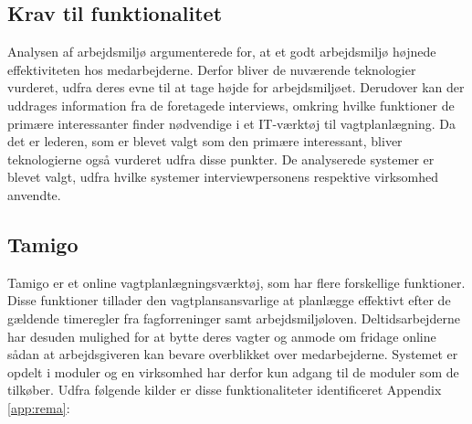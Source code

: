 \subsection{Krav til funktionalitet}
Analysen af arbejdsmiljø argumenterede for, at et godt arbejdsmiljø højnede effektiviteten hos medarbejderne. Derfor bliver de nuværende teknologier vurderet, udfra deres evne til at tage højde for arbejdsmiljøet. Derudover kan der uddrages information fra de foretagede interviews, omkring hvilke funktioner de primære interessanter finder nødvendige i et IT-værktøj til vagtplanlægning. Da det er lederen, som er blevet valgt som den primære interessant, bliver teknologierne også vurderet udfra disse punkter. De analyserede systemer er blevet valgt, udfra hvilke systemer interviewpersonens respektive virksomhed anvendte. 

\subsection{Tamigo}
Tamigo er et online vagtplanlægningsværktøj, som har flere forskellige funktioner. Disse funktioner tillader den vagtplansansvarlige at planlægge effektivt efter de gældende timeregler fra fagforreninger samt arbejdsmiljøloven. Deltidsarbejderne har desuden mulighed for at bytte deres vagter og anmode om fridage online sådan at arbejdsgiveren kan bevare overblikket over medarbejderne. Systemet er opdelt i moduler og en virksomhed har derfor kun adgang til de moduler som de tilkøber. Udfra følgende kilder er disse funktionaliteter identificeret \citep{Tamigo, Trustpilot} Appendix \ref{app:rema}:

